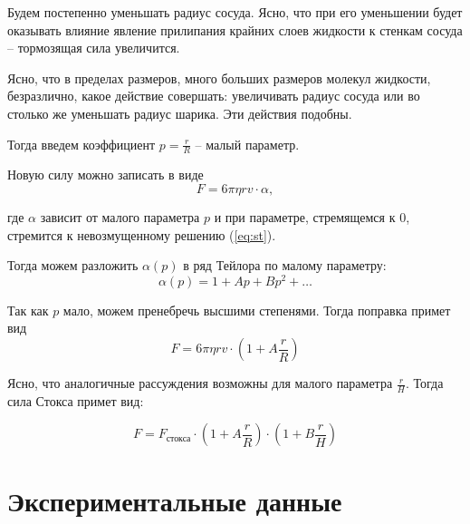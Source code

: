 \documentclass[a4paper,12pt]{article}
\begin{document}
Будем постепенно уменьшать радиус сосуда. Ясно, что при его уменьшении будет оказывать влияние явление прилипания крайних слоев жидкости к стенкам сосуда -- тормозящая сила увеличится. 

Ясно, что в пределах размеров, много больших размеров молекул жидкости, безразлично, какое действие совершать: увеличивать радиус сосуда или во столько же уменьшать радиус шарика. Эти действия подобны.

Тогда введем коэффициент $p=\frac{r}{R}$ -- малый параметр.

Новую силу можно записать в виде 
\begin{equation}
	F=6\pi\eta{r}v\cdot\alpha,
\end{equation}

где $\alpha$ зависит от малого параметра $p$ и при параметре, стремящемся к 0, стремится к невозмущенному решению (\ref{eq:st}).

Тогда можем разложить $\alpha(p)$ в ряд Тейлора по малому параметру:
\begin{equation}
	\alpha(p)=1+Ap+Bp^2+\ldots
\end{equation}

Так как $p$ мало, можем пренебречь высшими степенями. Тогда поправка примет вид
\begin{equation}
	F=6\pi\eta{r}v\cdot(1+A\frac{r}{R})
\end{equation}

Ясно, что аналогичные рассуждения возможны для малого параметра $\frac{r}{H}$. Тогда сила Стокса примет вид:

\begin{equation}
	F=F_\text{стокса}\cdot(1+A\frac{r}{R})\cdot(1+B\frac{r}{H})
\end{equation}

\section{Экспериментальные данные}
\end{document}

